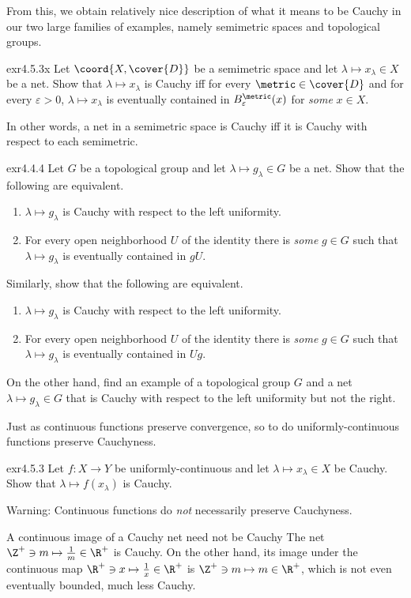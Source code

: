 From this, we obtain relatively nice description of what it means to be Cauchy in our two large families of examples, namely semimetric spaces and topological groups.
\begin{exr}{}{exr4.5.3x}
Let $\coord{X,\cover{D}}$ be a semimetric space and let $\lambda \mapsto x_\lambda \in X$ be a net.  Show that $\lambda \mapsto x_\lambda$ is Cauchy iff for every $\metric \in \cover{D}$ and for every $\varepsilon >0$, $\lambda \mapsto x_\lambda$ is eventually contained in $B_{\varepsilon}^{\metric}(x)$ for \emph{some} $x\in X$.
\begin{rmk}
In other words, a net in a semimetric space is Cauchy iff it is Cauchy with respect to each semimetric.
\end{rmk}
\end{exr}
\begin{exr}{}{exr4.4.4}
Let $G$ be a topological group and let $\lambda \mapsto g_\lambda \in G$ be a net.  Show that the following are equivalent.
\begin{enumerate}
\item $\lambda \mapsto g_\lambda$ is Cauchy with respect to the left uniformity.
\item For every open neighborhood $U$ of the identity there is \emph{some} $g\in G$ such that $\lambda \mapsto g_\lambda$ is eventually contained in $gU$.
\end{enumerate}
Similarly, show that the following are equivalent.
\begin{enumerate}
\item $\lambda \mapsto g_\lambda$ is Cauchy with respect to the left uniformity.

\item For every open neighborhood $U$ of the identity there is \emph{some} $g\in G$ such that $\lambda \mapsto g_\lambda$ is eventually contained in $Ug$.
\end{enumerate}
On the other hand, find an example of a topological group $G$ and a net $\lambda \mapsto g_{\lambda}\in G$ that is Cauchy with respect to the left uniformity but not the right.
\end{exr}

Just as continuous functions preserve convergence, so to do uniformly-continuous functions preserve Cauchyness.
\begin{exr}{}{exr4.5.3}
Let $f\colon X\rightarrow Y$ be uniformly-continuous and let $\lambda \mapsto x_\lambda \in X$ be Cauchy.  Show that $\lambda \mapsto f(x_\lambda)$ is Cauchy.
\begin{wrn}
Warning:  Continuous functions do \emph{not} necessarily preserve Cauchyness.
\end{wrn}
\end{exr}
\begin{exm}{A continuous image of a Cauchy net need not be Cauchy}{}
The net $\Z ^+\ni m\mapsto \frac{1}{m}\in \R ^+$ is Cauchy.  On the other hand, its image under the continuous map $\R ^+\ni x\mapsto \frac{1}{x}\in \R ^+$ is $\Z ^+\ni m\mapsto m\in \R ^+$, which is not even eventually bounded, much less Cauchy.
\end{exm}

